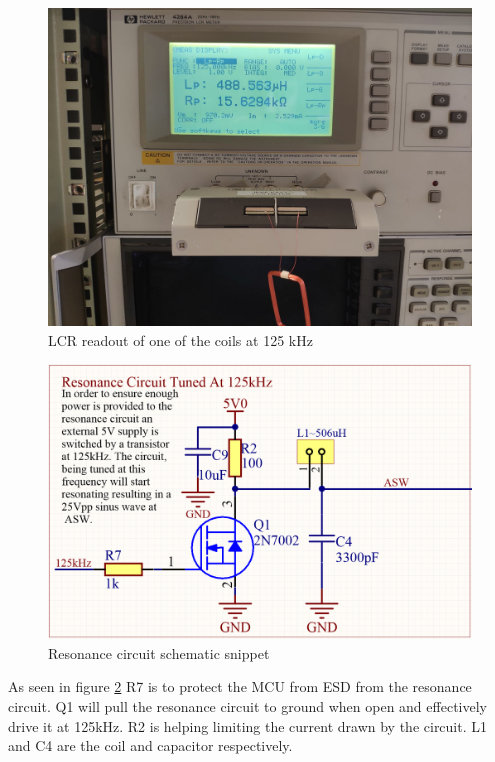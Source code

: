 \begin{figure}[h]
    \centering
    \includegraphics[width=\textwidth]{05_My_Implementation/figures/Coil_henry.jpg}
    \caption{LCR readout of one of the coils at 125 kHz}
    \label{fig:05:henry}
\end{figure}

\begin{figure}[h]
    \centering
    \includegraphics[width=\textwidth]{05_My_Implementation/figures/Resonance_circuit.png}
    \caption{Resonance circuit schematic snippet}
    \label{fig:05:Resonance_circuit}
\end{figure}

As seen in figure \ref{fig:05:Resonance_circuit} R7 is to protect the MCU from ESD from the resonance circuit. Q1 will pull the resonance circuit to ground when open and effectively drive it at 125kHz. R2 is helping limiting the current drawn by the circuit. L1 and C4 are the coil and capacitor respectively.

